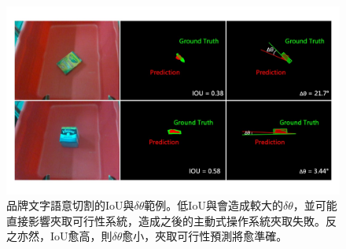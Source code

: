 \begin{figure}[ht]
	\centering
	\includegraphics[height=!, width=0.8\linewidth, keepaspectratio=true]
	{./figures/iou_deltatheta.jpg}
  \caption{品牌文字語意切割的IoU與$\delta\theta$範例。低IoU與會造成較大的$\delta\theta$，並可能直接影響夾取可行性系統，造成之後的主動式操作系統夾取失敗。反之亦然，IoU愈高，則$\delta\theta$愈小，夾取可行性預測將愈準確。}
  \label{figure:iou_deltatheta}
\end{figure}

